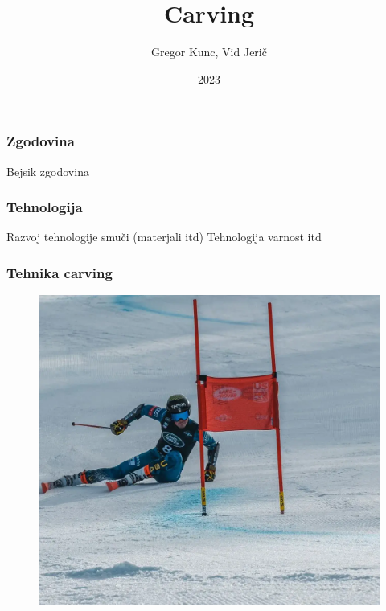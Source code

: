 \documentclass{beamer}
\title{Carving}
\author{Gregor Kunc, Vid Jerič}
\date{2023}
\begin{document}
\frame{\titlepage}

\begin{frame}
\frametitle{Zgodovina}
Bejsik zgodovina
\end{frame}

\begin{frame}
    \frametitle{Tehnologija}
    Razvoj tehnologije smuči (materjali itd) Tehnologija varnost itd
\end{frame}

\begin{frame}
    \frametitle{Tehnika carving}
    
\begin{figure}
    \centering
    \includegraphics[scale=0.2]{../images/River-Radamus-Arcing-a-GS-turn 1.png} \\
\end{figure}

\end{frame}
\end{document}
